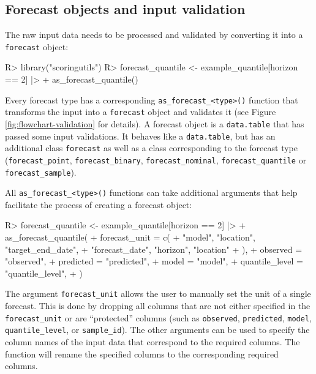\documentclass[
]{jss}
\begin{document}
\subsection{Forecast objects and input validation} \label{sec:validation}

The raw input data needs to be processed and validated by converting it
into a \texttt{forecast} object:

\begin{CodeChunk}
\begin{CodeInput}
R> library("scoringutils")
R> forecast_quantile <- example_quantile[horizon == 2] |>
+   as_forecast_quantile() 
\end{CodeInput}
\end{CodeChunk}

Every forecast type has a corresponding
\texttt{as\_forecast\_\textless{}type\textgreater{}()} function that
transforms the input into a \texttt{forecast} object and validates it
(see Figure \ref{fig:flowchart-validation} for details). A forecast
object is a \texttt{data.table} that has passed some input validations.
It behaves like a \texttt{data.table}, but has an additional class
\texttt{forecast} as well as a class corresponding to the forecast type
(\texttt{forecast\_point}, \texttt{forecast\_binary},
\texttt{forecast\_nominal}, \texttt{forecast\_quantile} or
\texttt{forecast\_sample}).

All \texttt{as\_forecast\_\textless{}type\textgreater{}()} functions can
take additional arguments that help facilitate the process of creating a
forecast object:

\begin{CodeChunk}
\begin{CodeInput}
R> forecast_quantile <- example_quantile[horizon == 2] |>
+   as_forecast_quantile(
+     forecast_unit = c(
+       "model", "location", "target_end_date", 
+       "forecast_date", "horizon", "location"
+     ),
+     observed = "observed", 
+     predicted = "predicted",
+     model = "model",
+     quantile_level = "quantile_level",
+   ) 
\end{CodeInput}
\end{CodeChunk}

The argument \texttt{forecast\_unit} allows the user to manually set the
unit of a single forecast. This is done by dropping all columns that are
not either specified in the \texttt{forecast\_unit} or are ``protected''
columns (such as \texttt{observed}, \texttt{predicted}, \texttt{model},
\texttt{quantile\_level}, or \texttt{sample\_id}). The other arguments
can be used to specify the column names of the input data that
correspond to the required columns. The function will rename the
specified columns to the corresponding required columns.
\end{document}
